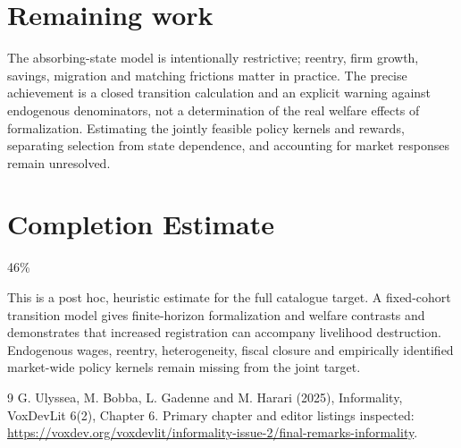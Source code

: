 \documentclass[11pt]{article}
\begin{document}
\section*{Remaining work}
The absorbing-state model is intentionally restrictive; reentry, firm growth, savings, migration and matching frictions matter in practice. The precise achievement is a closed transition calculation and an explicit warning against endogenous denominators, not a determination of the real welfare effects of formalization. Estimating the jointly feasible policy kernels and rewards, separating selection from state dependence, and accounting for market responses remain unresolved.

\section{Completion Estimate}
46\%

This is a post hoc, heuristic estimate for the full catalogue target.
A fixed-cohort transition model gives finite-horizon formalization and welfare contrasts and demonstrates that increased registration can accompany livelihood destruction. Endogenous wages, reentry, heterogeneity, fiscal closure and empirically identified market-wide policy kernels remain missing from the joint target.

\begin{thebibliography}{9}
 G. Ulyssea, M. Bobba, L. Gadenne and M. Harari (2025), Informality, VoxDevLit 6(2), Chapter 6. Primary chapter and editor listings inspected:
\url{https://voxdev.org/voxdevlit/informality-issue-2/final-remarks-informality}.
\end{thebibliography}
\end{document}
